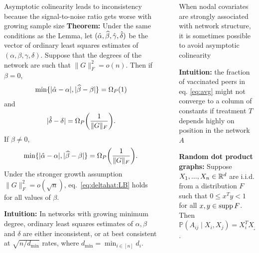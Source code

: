 \documentclass[final]{beamer}
\newlength{\sepwidth}
\newlength{\colwidth}
\newcommand{\separatorcolumn}{\begin{column}{\sepwidth}\end{column}}
\begin{document}
\begin{frame}[t]
\begin{columns}[t]
\begin{column}{\colwidth}
\begin{block}{Asymptotic colinearity leads to inconsistency because the signal-to-noise ratio gets worse with growing sample size}
                \textbf{Theorem:} Under the same conditions as the Lemma, let $(\hat{\alpha}, \widehat{\beta}, \hat{\gamma}, \hat{\delta})$ be the vector of ordinary least squares estimates of $(\alpha, \beta, \gamma, \delta)$. Suppose that the degrees of the network are such that $\| G \|_F^2 = o(n)$.
                Then if $\beta = 0$,
                \begin{equation*}
                    \min\{ |\alphahat-\alpha|, |\betahat-\beta| \}
                    = \Omegap{ 1 }
                \end{equation*}
                and
                \begin{equation} \label{eq:deltahat:LB}
                    | \deltahat - \delta | = \Omegap{ \frac{1}{\|G\|_F} }.
                \end{equation}
                If $\beta \neq 0$,
                \begin{equation*}
                    \min\{ |\alphahat-\alpha|, |\betahat-\beta| \}
                    = \Omegap{ \frac{1}{\|G\|_F} }.
                \end{equation*}
                Under the stronger growth assumption $\|G\|_F^2 = o( \sqrt{n} )$, eq.~\eqref{eq:deltahat:LB} holds for all values of $\beta$.
                \vspace{3mm}

                \textbf{Intuition:} In networks with growing minimum degree, ordinary least squares estimates of $\alpha, \beta$ and $\delta$ are either inconsistent, or at best consistent at $\sqrt{n / d_\mathrm{min}}$ rates, where $d_\mathrm{min} = \min_{i \in [n]} d_i$.
            \end{block}
        \end{column}

        \separatorcolumn

        \begin{column}{\colwidth}
            \begin{block}{When nodal covariates are strongly associated with network structure, it is sometimes possible to avoid asymptotic colinearity}

                \textbf{Intuition:} the fraction of vaccinated peers in eq. \eqref{eq:avg} might not converge to a column of constants if treatment $T$ depends highly on position in the network $A$

                \textbf{Random dot product graphs:} Suppose $X_1, ..., X_n \in \mathbb{R}^d$ are i.i.d. from a distribution $F$ such that $0 \le x^T y < 1$ for all $x,y \in \operatorname*{supp} F$. Then $\mathbb{P}(A_{ij} \mid X_i, X_j) = X_i^T X_j$.


\end{block}
\end{column}
\end{columns}
\end{frame}
\end{document}
